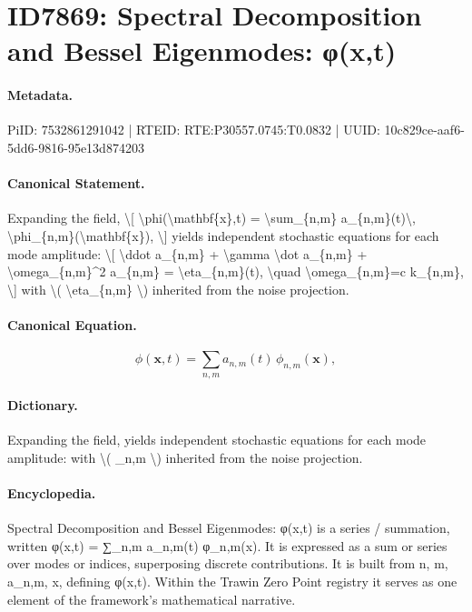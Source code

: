 \section*{ID7869: Spectral Decomposition and Bessel Eigenmodes: φ(x,t)}
\paragraph{Metadata.}
PiID: 7532861291042 | RTEID: RTE:P30557.0745:T0.0832 | UUID: 10c829ce-aaf6-5dd6-9816-95e13d874203

\paragraph{Canonical Statement.}
Expanding the field, \textbackslash{}[ \textbackslash{}phi(\textbackslash{}mathbf\{x\},t) = \textbackslash{}sum\_\{n,m\} a\_\{n,m\}(t)\textbackslash{}, \textbackslash{}phi\_\{n,m\}(\textbackslash{}mathbf\{x\}), \textbackslash{}] yields independent stochastic equations for each mode amplitude: \textbackslash{}[ \textbackslash{}ddot a\_\{n,m\} + \textbackslash{}gamma \textbackslash{}dot a\_\{n,m\} + \textbackslash{}omega\_\{n,m\}\textasciicircum{}2 a\_\{n,m\} = \textbackslash{}eta\_\{n,m\}(t), \textbackslash{}quad \textbackslash{}omega\_\{n,m\}=c k\_\{n,m\}, \textbackslash{}] with \textbackslash{}( \textbackslash{}eta\_\{n,m\} \textbackslash{}) inherited from the noise projection.

\paragraph{Canonical Equation.}
\[
\phi(\mathbf{x},t) = \sum_{n,m} a_{n,m}(t)\, \phi_{n,m}(\mathbf{x}),
\]

\paragraph{Dictionary.}
Expanding the field, yields independent stochastic equations for each mode amplitude: with \textbackslash{}( \_n,m \textbackslash{}) inherited from the noise projection.

\paragraph{Encyclopedia.}
Spectral Decomposition and Bessel Eigenmodes: φ(x,t) is a series / summation, written φ(x,t) = ∑\_n,m a\_n,m(t) φ\_n,m(x). It is expressed as a sum or series over modes or indices, superposing discrete contributions. It is built from n, m, a\_n,m, x, defining φ(x,t). Within the Trawin Zero Point registry it serves as one element of the framework's mathematical narrative.

